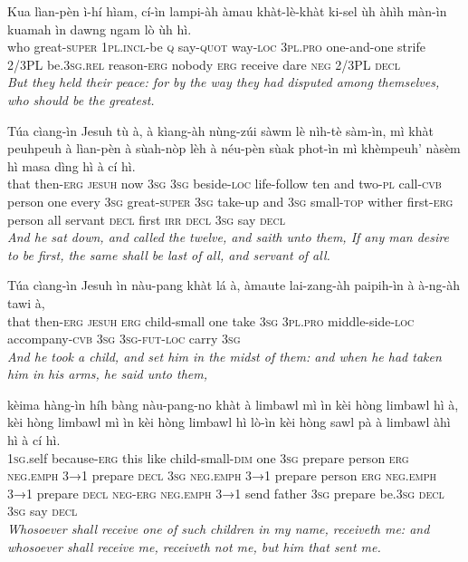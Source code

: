 \documentclass[11pt,a4paper]{article}
\begin{document}
\begin{exe}
\gll Kua lìan-pèn ì-hí hìam, cí-ìn lampi-àh àmau khàt-lè-khàt ki-sel ùh àhìh màn-ìn kuamah ìn dawng ngam lò ùh hì. \\
     who great-\textsc{super} \textsc{1pl}.\textsc{incl}-be \textsc{q} say-\textsc{quot} way-\textsc{loc} \textsc{3pl}.\textsc{pro} one-and-one strife 2/3PL be.\textsc{3sg}.\textsc{rel} reason-\textsc{erg} nobody \textsc{erg} receive dare \textsc{neg} 2/3PL \textsc{decl} \\
\glt \textcolor{kjvcolor}{\textit{But they held their peace: for by the way they had disputed among themselves, who should be the greatest.}}

\gll Túa cìang-ìn Jesuh tù à, à kìang-àh nùng-zúi sàwm lè nìh-tè sàm-ìn, mì khàt peuhpeuh à lìan-pèn à sùah-nòp lèh à néu-pèn sùak phot-ìn mì khèmpeuh' nàsèm hì masa dìng hì à cí hì. \\
     that then-\textsc{erg} \textsc{jesuh} now \textsc{3sg} \textsc{3sg} beside-\textsc{loc} life-follow ten and two-\textsc{pl} call-\textsc{cvb} person one every \textsc{3sg} great-\textsc{super} \textsc{3sg} take-up and \textsc{3sg} small-\textsc{top} wither first-\textsc{erg} person all servant \textsc{decl} first \textsc{irr} \textsc{decl} \textsc{3sg} say \textsc{decl} \\
\glt \textcolor{kjvcolor}{\textit{And he sat down, and called the twelve, and saith unto them, If any man desire to be first, the same shall be last of all, and servant of all.}}

\gll Túa cìang-ìn Jesuh ìn nàu-pang khàt lá à, àmaute lai-zang-àh paipih-ìn à à-ng-àh tawi à, \\
     that then-\textsc{erg} \textsc{jesuh} \textsc{erg} child-small one take \textsc{3sg} \textsc{3pl}.\textsc{pro} middle-side-\textsc{loc} accompany-\textsc{cvb} \textsc{3sg} \textsc{3sg}-\textsc{fut}-\textsc{loc} carry \textsc{3sg} \\
\glt \textcolor{kjvcolor}{\textit{And he took a child, and set him in the midst of them: and when he had taken him in his arms, he said unto them,}}

\gll kèima hàng-ìn híh bàng nàu-pang-no khàt à limbawl mì ìn kèi hòng limbawl hì à, kèi hòng limbawl mì ìn kèi hòng limbawl hì lò-ìn kèi hòng sawl pà à limbawl àhì hì à cí hì. \\
     \textsc{1sg}.self because-\textsc{erg} this like child-small-\textsc{dim} one \textsc{3sg} prepare person \textsc{erg} \textsc{neg}.\textsc{emph} \textsc{3→1} prepare \textsc{decl} \textsc{3sg} \textsc{neg}.\textsc{emph} \textsc{3→1} prepare person \textsc{erg} \textsc{neg}.\textsc{emph} \textsc{3→1} prepare \textsc{decl} \textsc{neg}-\textsc{erg} \textsc{neg}.\textsc{emph} \textsc{3→1} send father \textsc{3sg} prepare be.\textsc{3sg} \textsc{decl} \textsc{3sg} say \textsc{decl} \\
\glt \textcolor{kjvcolor}{\textit{Whosoever shall receive one of such children in my name, receiveth me: and whosoever shall receive me, receiveth not me, but him that sent me.}}


\end{exe}
\end{document}
